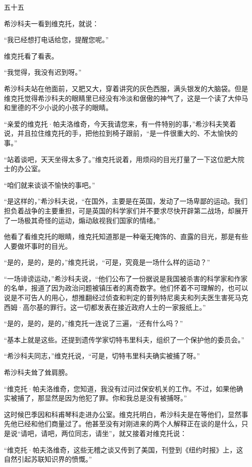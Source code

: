五十五

希沙科夫一看到维克托，就说：

“我已经想打电话给您，提醒您呢。”

维克托看了看表。

“我觉得，我没有迟到呀。”

希沙科夫站在他面前，又肥又大，穿着讲究的灰色西服，满头银发的大脑袋。但是维克托觉得希沙科夫的眼睛里已经没有冷淡和倨傲的神气了，这是一个读了大仲马和里德的不少小说的小孩子的眼睛。

“亲爱的维克托·帕夫洛维奇，今天我请您来，有一件特别的事，”希沙科夫笑着说，并且拉住维克托的手，把他拉到椅子跟前，“是一件很重大的、不太愉快的事。”

“站着谈吧，天天坐得太多了。”维克托说着，用烦闷的目光打量了一下这位肥大院士的办公室。

“咱们就来谈谈不愉快的事吧。”

“是这样的，”希沙科夫说，“在国外，主要是在英国，发动了一场卑鄙的运动。我们担负着战争的主要重担，可是英国的科学家们并不要求尽快开辟第二战场，却展开了一场极其奇怪的运动，煽动敌视我们国家的情绪。”

他看了看维克托的眼睛，维克托知道那是一种毫无掩饰的、直露的目光，那是有些人要做坏事时的目光。

“是的，是的，是的，”维克托说，“可是，究竟是一场什么样的运动？”

“一场诽谤运动，”希沙科夫说，“他们公布了一份据说是我国被杀害的科学家和作家的名单，报道了因为政治问题被镇压者的离奇数字。他们怀着不可理解的，也可以说是不可告人的用心，想推翻经过侦查和判定的普列特尼奥夫和列夫医生害死马克西姆·高尔基的罪行。这一切都发表在接近政府人士的一家报纸上。”

“是的，是的，是的，”维克托一连说了三遍，“还有什么吗？”

“基本上就是这些。还提到遗传学家切特韦里科夫，组织了一个保护他的委员会。”

“希沙科夫同志，”维克托说，“可是，切特韦里科夫确实被捕了呀。”

希沙科夫耸了耸肩膀。

“维克托·帕夫洛维奇，您知道，我没有过问过保安机关的工作。不过，如果他确实被捕了，那显然是因为他犯了罪。你和我总是没有被捕呀。”

这时候巴季因和科甫琴科走进办公室。维克托明白，希沙科夫是在等他们，显然事先他已经和他们商量过了。他甚至没有对刚进来的两个人解释正在谈的是什么，只是说“请吧，请吧，两位同志，请坐”，就又接着对维克托说：

“维克托·帕夫洛维奇，这些无稽之谈又传到了美国，刊登到《纽约时报》上，这自然引起苏联知识界的愤慨。”

